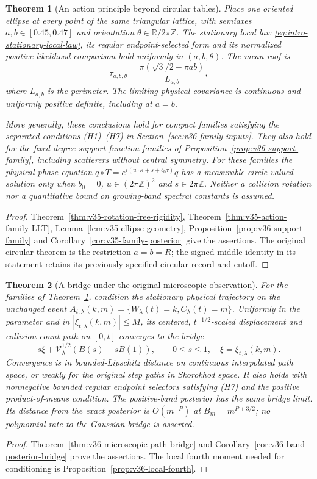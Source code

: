 \documentclass[11pt,reqno]{amsart}
\numberwithin{equation}{section}
\newtheorem{leadtheorem}{Theorem}
\theoremstyle{definition}\newtheorem{definition}[theorem]{Definition}
\theoremstyle{remark}\newtheorem{remark}[theorem]{Remark}
\newcommand{\R}{\mathbb R}\newcommand{\Z}{\mathbb Z}\newcommand{\T}{\mathbb T}
\begin{document}
\begin{leadtheorem}[An action principle beyond circular tables]
\label{thm:intro-action-family}
Place one oriented ellipse at every point of the same triangular lattice,
with semiaxes $a,b\in[0.45,0.47]$ and orientation $\theta\in\R/2\pi\Z$.
The stationary local law \eqref{eq:intro-stationary-local-law}, its regular
endpoint-selected form and its normalized positive-likelihood comparison
hold uniformly in $(a,b,\theta)$. The mean roof is
\[
 \bar\tau_{a,b,\theta}=\frac{\pi(\sqrt3/2-\pi ab)}{L_{a,b}},
\]
where $L_{a,b}$ is the perimeter. The limiting physical covariance is
continuous and uniformly positive definite, including at $a=b$.

More generally, these conclusions hold for compact families satisfying
the separated conditions \textup{(H1)--(H7)} in
Section~\ref{sec:v36-family-inputs}. They also hold for the fixed-degree
support-function families of Proposition~\ref{prop:v36-support-family},
including scatterers without central symmetry.
For these families the physical phase equation
$q\circ T=e^{i(u\cdot\kappa+s+b_0\tau)}q$ has a measurable circle-valued
solution only when $b_0=0$, $u\in(2\pi\Z)^2$ and $s\in2\pi\Z$.
Neither a collision rotation nor a quantitative bound on growing-band
spectral constants is assumed.
\end{leadtheorem}
\begin{proof}
Theorem~\ref{thm:v35-rotation-free-rigidity},
Theorem~\ref{thm:v35-action-family-LLT},
Lemma~\ref{lem:v35-ellipse-geometry},
Proposition~\ref{prop:v36-support-family} and
Corollary~\ref{cor:v35-family-posterior} give the assertions.
The original circular theorem is the restriction $a=b=R$; the signed
middle identity in its statement retains its previously specified
circular record and cutoff.
\end{proof}

\begin{leadtheorem}[A bridge under the original microscopic observation]
\label{thm:intro-exact-path-bridge}
For the families of Theorem~\ref{thm:intro-action-family}, condition the
stationary physical trajectory on the unchanged event
$A_{t,\lambda}(k,m)=\{W_\lambda(t)=k,C_\lambda(t)=m\}$.
Uniformly in the parameter and in $|\xi_{t,\lambda}(k,m)|\le M$, its
centered, $t^{-1/2}$-scaled displacement and collision-count path on
$[0,t]$ converges to the bridge
\[
 s\xi+\mathcal V_\lambda^{1/2}(B(s)-sB(1)),\qquad 0\le s\le1,
 \quad \xi=\xi_{t,\lambda}(k,m).
\]
Convergence is in bounded-Lipschitz distance on continuous interpolated
path space, or weakly for the original step paths in Skorokhod space.
It also holds with nonnegative bounded regular endpoint selectors
satisfying \textup{(H7)} and the positive product-of-means condition.
The positive-band posterior has the same bridge limit. Its distance
from the exact posterior is $O(m^{-P})$ at $B_m=m^{P+3/2}$; no
polynomial rate to the Gaussian bridge is asserted.
\end{leadtheorem}
\begin{proof}
Theorem~\ref{thm:v36-microscopic-path-bridge} and
Corollary~\ref{cor:v36-band-posterior-bridge} prove the assertions.
The local fourth moment needed for conditioning is
Proposition~\ref{prop:v36-local-fourth}.
\end{proof}
\end{document}
